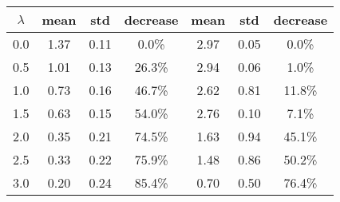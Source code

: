 \begin{tabular}{c||c|c|c||c|c|c}
\toprule
 $\lambda$ &  mean &  std & decrease &  mean &  std & decrease \\
\midrule
       0.0 &  1.37 & 0.11 &    0.0\% &  2.97 & 0.05 &    0.0\% \\
       0.5 &  1.01 & 0.13 &   26.3\% &  2.94 & 0.06 &    1.0\% \\
       1.0 &  0.73 & 0.16 &   46.7\% &  2.62 & 0.81 &   11.8\% \\
       1.5 &  0.63 & 0.15 &   54.0\% &  2.76 & 0.10 &    7.1\% \\
       2.0 &  0.35 & 0.21 &   74.5\% &  1.63 & 0.94 &   45.1\% \\
       2.5 &  0.33 & 0.22 &   75.9\% &  1.48 & 0.86 &   50.2\% \\
       3.0 &  0.20 & 0.24 &   85.4\% &  0.70 & 0.50 &   76.4\% \\
\bottomrule
\end{tabular}
